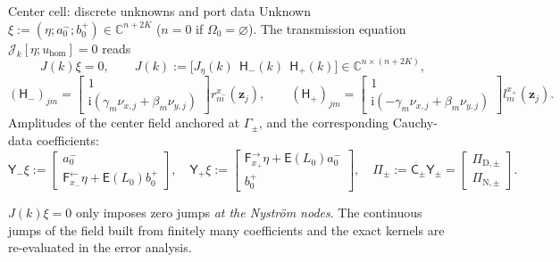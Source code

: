 \documentclass[aspectratio=169]{beamer}
\newcommand{\ii}{\mathrm{i}}
\newcommand{\CC}{\mathbb{C}}
\begin{document}
\begin{frame}{Center cell: discrete unknowns and port data}
  \small
  Unknown $\xi:=(\eta;a^-_0;b^+_0)\in\CC^{n+2K}$ ($n=0$ if $\Omega_0=\varnothing$).
  The transmission equation $\mathscr J_k[\eta;u_{\mathrm{hom}}]=0$ reads
  \[
    J(k)\xi=0,\qquad J(k):=\bigl[J_\eta(k)\ \ \mathsf H_-(k)\ \ \mathsf H_+(k)\bigr]\in\CC^{n\times(n+2K)},
  \]
  \[
    (\mathsf H_-)_{jm}=\begin{bmatrix}1\\ \ii(\gamma_m\nu_{x,j}+\beta_m\nu_{y,j})\end{bmatrix}r_m^{x_-}(\mathbf z_j),\qquad
    (\mathsf H_+)_{jm}=\begin{bmatrix}1\\ \ii(-\gamma_m\nu_{x,j}+\beta_m\nu_{y,j})\end{bmatrix}l_m^{x_+}(\mathbf z_j).
  \]
  Amplitudes of the center field anchored at $\Gamma_\pm$, and the corresponding
  Cauchy-data coefficients:
  \[
    \mathsf Y_-\xi:=\begin{bmatrix}a^-_0\\ \mathsf F^{\leftarrow}_{x_-}\eta+\mathsf E(L_0)b^+_0\end{bmatrix},\quad
    \mathsf Y_+\xi:=\begin{bmatrix}\mathsf F^{\rightarrow}_{x_+}\eta+\mathsf E(L_0)a^-_0\\ b^+_0\end{bmatrix},\quad
    \Pi_\pm:=\mathsf C_\pm\mathsf Y_\pm=\begin{bmatrix}\Pi_{\mathrm D,\pm}\\ \Pi_{\mathrm N,\pm}\end{bmatrix}.
  \]
  \begin{alertblock}{}
    $J(k)\xi=0$ only imposes zero jumps \emph{at the Nystr\"om nodes}. The continuous
    jumps of the field built from finitely many coefficients and the exact kernels are
    re-evaluated in the error analysis.
  \end{alertblock}
\end{frame}
\end{document}
